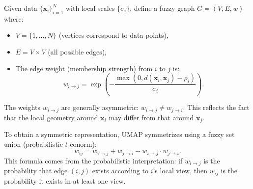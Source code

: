 \begin{definition}
  Given data $\{\mathbf{x}_i\}_{i=1}^N$ with local scales $\{\sigma_i\}$, define a fuzzy graph $G = (V, E, w)$ where:
  \begin{itemize}
    \item $V = \{1, \dots, N\}$ (vertices correspond to data points),
    \item $E = V \times V$ (all possible edges),
    \item The edge weight (membership strength) from $i$ to $j$ is:
          \begin{equation}\label{eq:umap-weight}
            w_{i \to j} = \exp\left(-\frac{\max(0, d(\mathbf{x}_i, \mathbf{x}_j) - \rho_i)}{\sigma_i}\right).
          \end{equation}
  \end{itemize}
\end{definition}

\begin{remark}
  The weights $w_{i \to j}$ are generally asymmetric: $w_{i \to j} \neq w_{j \to i}$. This reflects the fact that the local geometry around $\mathbf{x}_i$ may differ from that around $\mathbf{x}_j$.
\end{remark}

To obtain a symmetric representation, UMAP symmetrizes using a fuzzy set union (probabilistic $t$-conorm):
\begin{equation}\label{eq:umap-symmetrize}
  w_{ij} = w_{i \to j} + w_{j \to i} - w_{i \to j} \cdot w_{j \to i}.
\end{equation}
This formula comes from the probabilistic interpretation: if $w_{i \to j}$ is the probability that edge $(i,j)$ exists according to $i$'s local view, then $w_{ij}$ is the probability it exists in at least one view.

